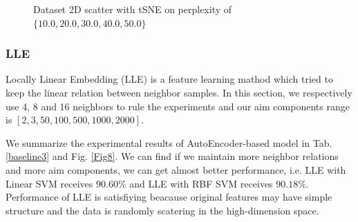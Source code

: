 \documentclass{article}
\begin{document}
\begin{figure}
{}
\quad
{}
\quad
{}
\quad
{}
\quad
{}
\caption{Dataset 2D scatter with tSNE on perplexity of $\{10.0,20.0,30.0,40.0,50.0\}$}
\label{Fig7}
\end{figure}

\subsubsection{LLE}
Locally Linear Embedding (LLE) is a feature learning mathod which tried to keep the linear relation between neighbor samples. In this section, we respectively use 4, 8 and 16 neighbors to rule the experiments and our aim components range is $[2, 3, 50, 100, 500, 1000, 2000]$.

We summarize the experimental results of AutoEncoder-based model in Tab. \ref{baseline3} and Fig. \ref{Fig8}. We can find if we maintain more neighbor relations and more aim components, we can get almost better performance, i.e. LLE with Linear SVM receives $90.60\%$ and LLE with RBF SVM receives $90.18\%$. Performance of LLE is satisfiying beacause original features may have simple structure and the data is randomly scatering in the high-dimension space.
\end{document}
